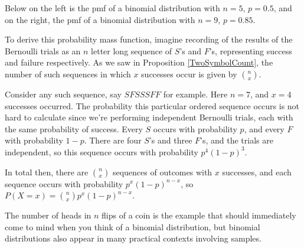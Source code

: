 Below on the left is the pmf of a binomial distribution with $n = 5$, $p = 0.5$, and on the right, the pmf of a binomial distribution with $n = 9$, $p = 0.85$.

\begin{center}
 \qquad\qquad  {}
\end{center}

To derive this probability mass function, imagine recording of the results of the Bernoulli trials as an $n$ letter long sequence of $S$'s and $F$'s, representing success and failure respectively. As we saw in Proposition \ref{TwoSymbolCount}, the number of such sequences in which $x$ successes occur is given by $\binom{n}{x}$.

Consider any such sequence, say $SFSSSFF$ for example. Here $n=7$, and $x=4$ successes occurred. The probability this particular ordered sequence occurs is not hard to calculate since we're performing independent Bernoulli trials, each with the same probability of success. Every $S$ occurs with probability $p$, and every $F$ with probability $1-p$. There are four $S$'s and three $F$'s, and the trials are independent, so this sequence occurs with probability $p^4(1-p)^3$.

In total then, there are $\binom{n}{x}$ sequences of outcomes with $x$ successes, and each sequence occurs with probability $p^x(1-p)^{n-x}$, so $P(X = x) = \binom{n}{x}p^x(1-p)^{n-x}$.

The number of heads in $n$ flips of a coin is the example that should immediately come to mind when you think of a binomial distribution, but binomial distributions also appear in many practical contexts involving samples.


